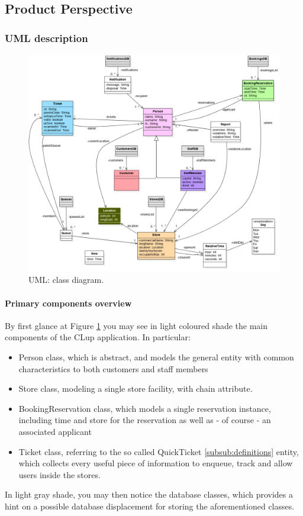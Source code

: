 \sffamily

\subsection{Product Perspective}

\subsubsection{UML description}
\begin{figure} [H]
	\includegraphics[width=\linewidth]{../Diagrams/main_class_diagram.png}
	\caption{UML: class diagram.}
	\label{fig:UML}
\end{figure}
\paragraph{Primary components overview}
By first glance at Figure \ref{fig:UML} you may see in light coloured shade the main components of the CLup application. In particular:\newline
\begin{itemize}
    \item Person class, which is abstract, and models the general entity with common characteristics to both customers and staff members
    \item Store class, modeling a single store facility, with chain attribute.
    \item BookingReservation class, which models a single reservation instance, including time and store for the reservation as well as - of course - an associated applicant
    \item Ticket class, referring to the so called QuickTicket \ref{subsub:definitions} entity, which collects every useful piece of information to enqueue, track and allow users inside the stores.
\end{itemize}
In light gray shade, you may then notice the database classes,  which provides a hint on a possible database displacement for storing the aforementioned classes.

